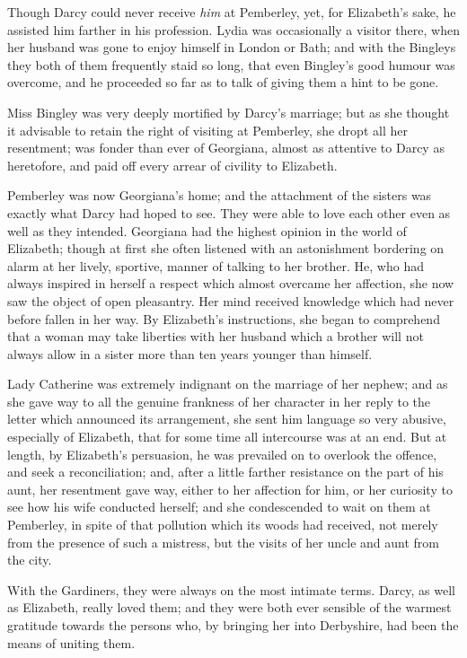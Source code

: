 \documentclass[12pt,english,oneside]{book}
\begin{document}
Though Darcy could never receive \textit{him} at Pemberley, yet, for
Elizabeth's sake, he assisted him farther in his profession. Lydia
was occasionally a visitor there, when her husband was gone to enjoy
himself in London or Bath; and with the Bingleys they both of them
frequently staid so long, that even Bingley's good humour was overcome,
and he proceeded so far as to talk of giving them a hint to be gone.

Miss Bingley was very deeply mortified by Darcy's marriage; but as
she thought it advisable to retain the right of visiting at Pemberley,
she dropt all her resentment; was fonder than ever of Georgiana, almost
as attentive to Darcy as heretofore, and paid off every arrear of
civility to Elizabeth.

Pemberley was now Georgiana's home; and the attachment of the sisters
was exactly what Darcy had hoped to see. They were able to love each
other even as well as they intended. Georgiana had the highest opinion
in the world of Elizabeth; though at first she often listened with
an astonishment bordering on alarm at her lively, sportive, manner
of talking to her brother. He, who had always inspired in herself
a respect which almost overcame her affection, she now saw the object
of open pleasantry. Her mind received knowledge which had never before
fallen in her way. By Elizabeth's instructions, she began to comprehend
that a woman may take liberties with her husband which a brother will
not always allow in a sister more than ten years younger than himself.

Lady Catherine was extremely indignant on the marriage of her nephew;
and as she gave way to all the genuine frankness of her character
in her reply to the letter which announced its arrangement, she sent
him language so very abusive, especially of Elizabeth, that for some
time all intercourse was at an end. But at length, by Elizabeth's
persuasion, he was prevailed on to overlook the offence, and seek
a reconciliation; and, after a little farther resistance on the part
of his aunt, her resentment gave way, either to her affection for
him, or her curiosity to see how his wife conducted herself; and she
condescended to wait on them at Pemberley, in spite of that pollution
which its woods had received, not merely from the presence of such
a mistress, but the visits of her uncle and aunt from the city.

With the Gardiners, they were always on the most intimate terms. Darcy,
as well as Elizabeth, really loved them; and they were both ever sensible
of the warmest gratitude towards the persons who, by bringing her
into Derbyshire, had been the means of uniting them. 
\end{document}
